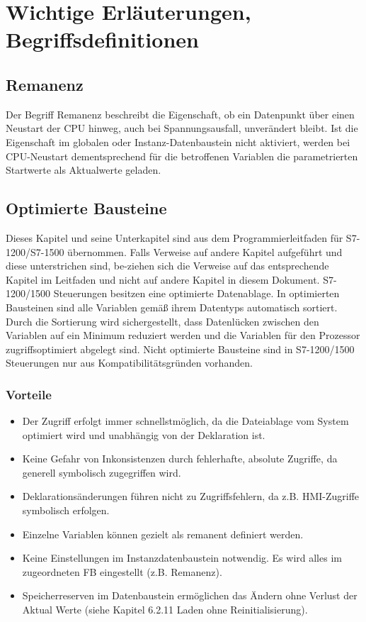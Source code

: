 \section{Wichtige Erläuterungen, Begriffsdefinitionen}
\subsection{Remanenz}
Der Begriff \glqq Remanenz\grqq{} beschreibt die Eigenschaft, ob ein Datenpunkt über einen Neustart der CPU hinweg, auch bei Spannungsausfall, unverändert bleibt. Ist die Eigenschaft im globalen oder Instanz-Datenbaustein nicht aktiviert, werden bei CPU-Neustart dementsprechend für die betroffenen Variablen die parametrierten Startwerte als Aktualwerte geladen.


\clearpage
\subsection{Optimierte Bausteine \cite[13]{Beckhoff}}
Dieses Kapitel und seine Unterkapitel sind aus dem Programmierleitfaden für S7-1200/S7-1500 übernommen. Falls Verweise auf andere Kapitel aufgeführt und diese unterstrichen sind, be-ziehen sich die Verweise auf das entsprechende Kapitel im Leitfaden und nicht auf andere Kapitel in diesem Dokument.
S7-1200/1500 Steuerungen besitzen eine optimierte Datenablage. In optimierten Bausteinen sind alle Variablen gemäß ihrem Datentyps automatisch sortiert. Durch die Sortierung wird sichergestellt, dass Datenlücken zwischen den Variablen auf ein Minimum reduziert werden und die Variablen für den Prozessor zugriffsoptimiert abgelegt sind.  
Nicht optimierte Bausteine sind in S7-1200/1500 Steuerungen nur aus Kompatibilitätsgründen vorhanden. 

\subsubsection{Vorteile}
\begin{itemize}
    \item Der Zugriff erfolgt immer schnellstmöglich, da die Dateiablage vom System optimiert wird und unabhängig von der Deklaration ist.
    \item Keine Gefahr von Inkonsistenzen durch fehlerhafte, absolute Zugriffe, da generell symbolisch zugegriffen wird.
    \item Deklarationsänderungen führen nicht zu Zugriffsfehlern, da z.B. HMI-Zugriffe symbolisch erfolgen. 
    \item Einzelne Variablen können gezielt als remanent definiert werden.
    \item Keine Einstellungen im Instanzdatenbaustein notwendig. Es wird alles im zugeordneten FB eingestellt (z.B. Remanenz).
    \item Speicherreserven im Datenbaustein ermöglichen das Ändern ohne Verlust der Aktual Werte (siehe Kapitel 6.2.11 Laden ohne Reinitialisierung).
    

    \end{itemize}